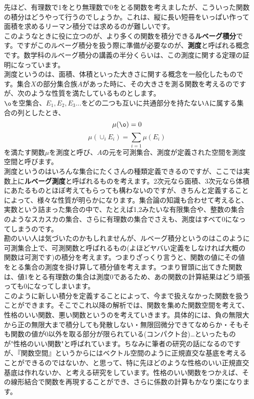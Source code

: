 先ほど、有理数で1をとり無理数で0をとる関数を考えましたが、こういった関数の積分はどうやって行うのでしょうか。これは、縦に長い短冊をいっぱい作って面積を求めるリーマン積分では求めるのが難しいです。\\
このようなときに役に立つのが、より多くの関数を積分できる{\bf ルベーグ積分}です。ですがこのルベーグ積分を扱う際に準備が必要なのが、{\bf 測度}と呼ばれる概念です。数学科のルベーグ積分の講義の半分くらいは、この測度に関する定理の証明になっています。\\
測度というのは、面積、体積といった大きさに関する概念を一般化したものです。集合$X$の部分集合族$A$があった時に、その大きさを測る関数を考えるのですが、次のような性質を満たしているものとします。\\
$\o$を空集合、$E_1,E_2,E_3...$をどの二つも互いに共通部分を持たないAに属する集合の列としたとき、
\[
\mu (\o) = 0
\]
\[
\mu (\cup_i E_i) = \sum_{i=1} \mu (E_i)
\]
を満たす関数$\mu$を測度と呼び、$A$の元を可測集合、測度が定義された空間を測度空間と呼びます。\\
測度というのはいろんな集合にたくさんの種類定義できるのですが、ここでは実数上に{\bf ルベーグ測度}と呼ばれるものを考えます。2次元なら面積、3次元なら体積にあたるものとほぼ考えてもらっても構わないのですが、きちんと定義することによって、様々な性質が明らかになります。集合論の知識も合わせて考えると、実数という詰まった集合の中で、たとえば{1,2}みたいな有限集合や、整数の集合のようなスカスカの集合、さらに有理数の集合でさえも、測度はすべて0になってしまうのです。\\
勘のいい人は気づいたのかもしれませんが、ルベーグ積分というのはこのように可測集合上で、可測関数と呼ばれるもの(よほどヤバい定義をしなければ大概の関数は可測です)の積分を考えます。つまりざっくり言うと、関数の値にその値をとる集合の測度を掛け算して積分値を考えます。つまり冒頭に出てきた関数は、値1をとる有理数の集合は測度0であるため、あの関数の計算結果はどう頑張っても0になってしまいます。\\
このように新しい積分を定義することによって、今まで扱えなかった関数を扱うことができます。そこでこれ以降の解析では、関数を集めた関数空間を考えて、性格のいい関数、悪い関数というのを考えていきます。具体的には、負の無限大から正の無限大まで積分しても発散しない・無限回微分できてなめらか・そもそも関数の値が0以外を取る部分が限られている(コンパクト台)…といったものが"性格のいい関数"と呼ばれています。ちなみに筆者の研究の話になるのですが、『関数空間』というからにはベクトル空間のように正規直交な基底を考えることができるのではないか、と思って、特に先ほどのような性格のいい正規直交基底は作れないか、と考える研究をしています。性格のいい関数をつかえば、その線形結合で関数を再現することができ、さらに係数の計算もかなり楽になります。

